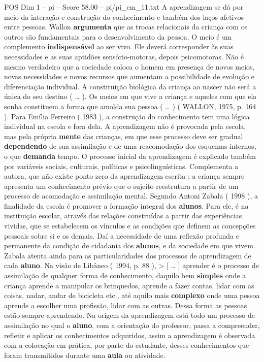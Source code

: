 \begin{textsample}{POS Dim 1 – pi – Score 58.00 – pi/pi\_em\_11.txt}
A aprendizagem se dá por meio da interação e construção do conhecimento e também dos laços afetivos entre pessoas.
Wallon \textbf{argumenta} que as trocas relacionais da criança com os outros são fundamentais para o desenvolvimento da pessoa.
O meio é um complemento \textbf{indispensável} ao ser vivo.
Ele deverá corresponder às suas necessidades e as suas aptidões sensório-motoras, depois psicomotoras.
Não é mesmo verdadeiro que a sociedade coloca o homem em presença de novos meios, novas necessidades e novos recursos que aumentam a possibilidade de evolução e diferenciação individual.
A constituição biológica da criança ao nascer não será a única do seu destino ( … ).
Os meios em que vive a criança e aqueles com que ela sonha constituem a forma que amolda sua pessoa ( … ) ( WALLON, 1975, p. 164 ).
Para Emília Ferreiro ( 1983 ), a construção do conhecimento tem uma lógica individual na escola e fora dela.
A aprendizagem não é provocada pela escola, mas pela própria \textbf{mente} das crianças, em que esse processo deve ser gradual \textbf{dependendo} de sua assimilação e de uma reacomodação dos esquemas internos, o que \textbf{demanda} tempo.
O processo inicial da aprendizagem é explicado também por variáveis sociais, culturais, políticas e psicolinguísticas.
Complementa a autora, que não existe ponto zero da aprendizagem escrita ; a criança sempre apresenta um conhecimento prévio que o sujeito reestrutura a partir de um processo de acomodação e assimilação mental.
Segundo Antoni Zabala ( 1998 ), a finalidade da escola é promover a formação integral dos \textbf{alunos}.
Para ele, é na instituição escolar, através das relações construídas a partir das experiências vividas, que se estabelecem os vínculos e as condições que definem as concepções pessoais sobre si e os demais.
Daí a necessidade de uma reflexão profunda e permanente da condição de cidadania dos \textbf{alunos}, e da sociedade em que vivem.
Zabala atenta ainda para as particularidades dos processos de aprendizagem de cada \textbf{aluno}.
Na visão de Libâneo ( 1994, p. 88 ), > [ … ] aprender é o processo de assimilação de qualquer forma de conhecimento, daquilo bem \textbf{simples} onde a criança aprende a manipular os brinquedos, aprende a fazer contas, lidar com as coisas, nadar, andar de bicicleta etc., até aquilo mais \textbf{complexo} onde uma pessoa aprende a escolher uma profissão, lidar com as outras.
Dessa forma as pessoas estão sempre aprendendo.
Na origem da aprendizagem está todo um processo de assimilação no qual o \textbf{aluno}, com a orientação do professor, passa a compreender, refletir e aplicar os conhecimentos adquiridos, assim a aprendizagem é observada com a colocação em prática, por parte do estudante, desses conhecimentos que foram transmitidos durante uma \textbf{aula} ou atividade.

\end{textsample}

